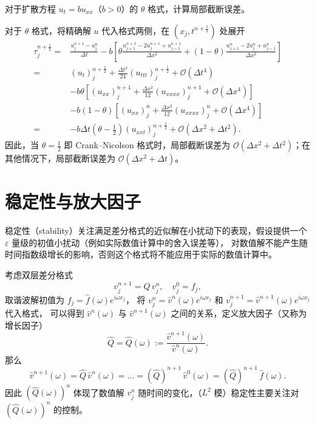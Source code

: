 \begin{example}
    对于扩散方程 $u_t = b u_{xx}$（$b>0$）的 $\theta$ 格式，计算局部截断误差。
\end{example}

\begin{solution*}
    对于 $\theta$ 格式，将精确解 $u$ 代入格式两侧，在 $(x_j,t^{n+\frac12})$ 处展开
    \begin{align*}
        \tau_j^{n+\frac12} ={} & \frac{u_j^{n+1}-u_j^n}{\Delta t} - b
        \left[
        \theta \frac{u_{j+1}^{n+1} - 2 u_j^{n+1} + u_{j-1}^{n+1}}{\Delta x^2}
        + (1-\theta) \frac{u_{j+1}^n - 2 u_j^n + u_{j-1}^n}{\Delta x^2}
        \right]                                                                                                                           \\
        ={}                    & (u_t)_j^{n+\frac12} + \frac{\Delta t^2}{24} (u_{ttt})_j^{n+\frac12} + \mathcal{O}(\Delta t^4)            \\
                               & - b \theta \left[
        (u_{xx})_{j}^{n+1} + \frac{\Delta x^2}{12} (u_{xxxx})_j^{n+1} + \mathcal{O}(\Delta x^4)
        \right]                                                                                                                           \\
                               & - b (1-\theta) \left[
        (u_{xx})_{j}^{n} + \frac{\Delta x^2}{12} (u_{xxxx})_j^{n} + \mathcal{O}(\Delta x^4)
        \right]
        \\
        ={}                    & -b \Delta t \left(\theta - \frac12\right) (u_{xxt})_j^{n+\frac12} + \mathcal{O}(\Delta x^2 + \Delta t^2).
    \end{align*}
    因此，当 $\theta = \frac12$ 即 Crank–Nicolson 格式时，局部截断误差为 $\mathcal{O}(\Delta x^2 + \Delta t^2)$；在其他情况下，局部截断误差为 $\mathcal{O}(\Delta x^2 + \Delta t)$。
\end{solution*}

\section{稳定性与放大因子}

稳定性（stability）关注满足差分格式的近似解在小扰动下的表现，假设提供一个 $\varepsilon$ 量级的初值小扰动（例如实际数值计算中的舍入误差等），
对数值解不能产生随时间指数级增长的影响，否则这个格式将不能应用于实际的数值计算中。

考虑双层差分格式
\[
    v_j^{n+1} = Q\,v_j^n,\quad v_j^0 = f_j,
\]
取谐波解初值为 $f_j = \hat{f}(\omega ) e^{i \omega  x_j}$，
将 $v_j^n =   \hat{v}^n(\omega ) e^{i \omega  x_j}$ 和 $v_j^{n+1} = \hat{v}^{n+1}(\omega ) e^{i \omega  x_j}$ 代入格式，
可以得到 $\hat{v}^n(\omega )$ 与 $\hat{v}^{n+1}(\omega )$ 之间的关系，定义放大因子（又称为增长因子）
\[
    \widehat{Q} = \widehat{Q}(\omega ) := \frac{\hat{v}^{n+1}(\omega )}{\hat{v}^n(\omega )}.
\]
那么
\[
    \hat{v}^{n+1}(\omega ) = \widehat{Q}\, \hat{v}^n(\omega ) = \dots =  (\widehat{Q})^{n+1}\, \hat{v}^0(\omega ) = (\widehat{Q})^{n+1}\, \hat{f}(\omega ).
\]
因此 $(\widehat{Q}(\omega))^{n}$ 体现了数值解 $v_j^n$ 随时间的变化，（$L^2$ 模）稳定性主要关注对 $(\widehat{Q}(\omega))^{n}$ 的控制。

